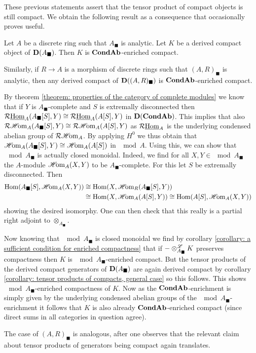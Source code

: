 These previous statements assert that the tensor product of compact objects is still compact. We obtain the following result as a consequence that occasionally proves useful.
\begin{lemma}
	\label{lemma: solid derived compacts are enriched compact}
	
	Let $A$ be a discrete ring such that $A_\blacksquare$ is analytic. Let $K$ be a derived compact object of ${{\mathbf{D}}(A_\blacksquare)}$. Then $K$ is ${{{\mathbf{Cond}}}{{\mathbf{Ab}}}}$-enriched compact.
	
	Similarly, if $R\to A$ is a morphism of discrete rings such that $(A, R)_\blacksquare$ is analytic, then any derived compact of ${{\mathbf{D}}((A, R)_\blacksquare)}$ is ${{{\mathbf{Cond}}}{{\mathbf{Ab}}}}$-enriched compact.
\end{lemma}
\begin{proofsketch}
	By theorem \ref{theorem: properties of the category of complete modules} we know that if $Y$ is $A_\blacksquare$-complete and $S$ is extremally disconnected then $\mathcal{R}{\underline{\operatorname{Hom}}}_A({A_\blacksquare[S]}, Y) \cong \mathcal{R}{\underline{\operatorname{Hom}}}_A({A[S]}, Y)$ in ${{\mathbf{D}}({{{\mathbf{Cond}}}{{\mathbf{Ab}}}})}$. This implies that also $\mathcal{R}{\operatorname{\mathscr{H}\!om}}_A({A_\blacksquare[S]}, Y) \cong \mathcal{R}{\operatorname{\mathscr{H}\!om}}_A({A[S]}, Y)$ as $\mathcal{R}{\underline{\operatorname{Hom}}}_A$ is the underlying condensed abelian group of $\mathcal{R}{\operatorname{\mathscr{H}\!om}}_A$. By applying $H^0$ we thus obtain that ${\operatorname{\mathscr{H}\!om}}_A({A_\blacksquare[S]}, Y) \cong {\operatorname{\mathscr{H}\!om}}_A({A[S]})$ in $\mod{A}$. Using this, we can show that $\mod{A_\blacksquare}$ is actually closed monoidal. Indeed, we find for all $X, Y\in\mod{A_\blacksquare}$ the $A$-module ${\operatorname{\mathscr{H}\!om}}_A(X, Y)$ to be $A_\blacksquare$-complete. For this let $S$ be extremally disconnected. Then
	\begin{align*}
		{\operatorname{Hom}}({A_\blacksquare[S]}, {\operatorname{\mathscr{H}\!om}}_A(X, Y)) &\cong {\operatorname{Hom}}(X, {\operatorname{\mathscr{H}\!om}}_R({A_\blacksquare[S]}, Y))\\
		& \cong {\operatorname{Hom}}(X, {\operatorname{\mathscr{H}\!om}}_A({A[S]}, Y)) \cong {\operatorname{Hom}}({A[S]}, {\operatorname{\mathscr{H}\!om}}_A(X, Y))
	\end{align*}
	showing the desired isomorphy. One can then check that this really is a partial right adjoint to $\otimes_{A_\blacksquare}$.
	
	Now knowing that $\mod{A_\blacksquare}$ is closed monoidal we find by corollary \ref{corollary: a sufficient condition for enriched compactness} that if $-\otimes^{\mathscr{L}}_{A_\blacksquare} K$ preserves compactness then $K$ is $\mod{A_\blacksquare}$-enriched compact. But the tensor products of the derived compact generators of ${{\mathbf{D}}(A_\blacksquare)}$ are again derived compact by corollary \ref{corollary: tensor products of compacts, general case} so this follows. This shows $\mod{A_\blacksquare}$-enriched compactness of $K$. Now as the ${{{\mathbf{Cond}}}{{\mathbf{Ab}}}}$-enrichment is simply given by the underlying condensed abelian groups of the $\mod{A_\blacksquare}$-enrichment it follows that $K$ is also already ${{{\mathbf{Cond}}}{{\mathbf{Ab}}}}$-enriched compact (since direct sums in all categories in question agree).
	
	The case of $(A, R)_\blacksquare$ is analogous, after one observes that the relevant claim about tensor products of generators being compact again translates.
\end{proofsketch}

